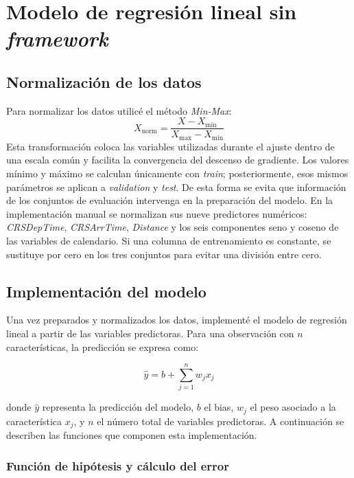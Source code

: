 \documentclass[a4paper,12pt,twocolumn]{report}
\begin{document}
\section{Modelo de regresión lineal sin \textit{framework}}

\subsection{Normalización de los datos}

Para normalizar los datos utilicé el método \textit{Min-Max}:
\begin{equation*}
X_{\text{norm}} = \frac{X - X_{\text{min}}}{X_{\text{max}} - X_{\text{min}}}
\end{equation*}
Esta transformación coloca las variables utilizadas durante el ajuste dentro de una escala común y facilita la convergencia del descenso de gradiente.
\newline
Los valores mínimo y máximo se calculan únicamente con \textit{train}; posteriormente, esos mismos parámetros se aplican a \textit{validation} y \textit{test}. De esta forma se evita que información de los conjuntos de evaluación intervenga en la preparación del modelo. En la implementación manual se normalizan sus nueve predictores numéricos: \textit{CRSDepTime}, \textit{CRSArrTime}, \textit{Distance} y los seis componentes seno y coseno de las variables de calendario. Si una columna de entrenamiento es constante, se sustituye por cero en los tres conjuntos para evitar una división entre cero.

\subsection{Implementación del modelo}

Una vez preparados y normalizados los datos, implementé el modelo de regresión lineal a partir de las variables predictoras. Para una observación con $n$ características, la predicción se expresa como:

\begin{equation}
\hat{y} = b + \sum_{j=1}^{n} w_j x_j
\end{equation}

donde $\hat{y}$ representa la predicción del modelo, $b$ el bias, $w_j$ el peso asociado a la característica $x_j$, y $n$ el número total de variables predictoras. A continuación se describen las funciones que componen esta implementación.

\subsubsection{Función de hipótesis y cálculo del error}
\end{document}
